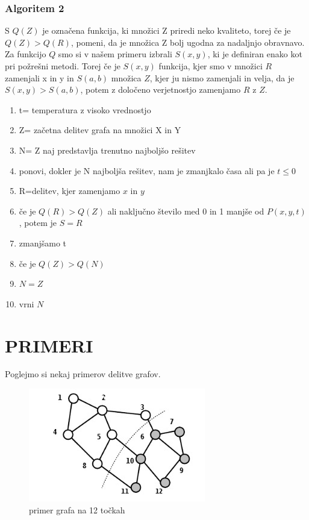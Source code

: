 \documentclass[12pt,a4paper]{amsart}
\theoremstyle{definition} %
\theoremstyle{plain} %
\begin{document}
\subsubsection{Algoritem 2}
S $Q(Z)$ je označena funkcija, ki množici Z priredi neko kvaliteto, torej če je $Q(Z) >Q(R)$, pomeni, da je množica Z bolj ugodna za nadaljnjo obravnavo.
Za funkcijo $Q$ smo si v našem primeru izbrali $S(x,y)$, ki je definiran enako kot pri požrešni metodi. Torej če je $S(x,y)$ funkcija, kjer smo v množici $R$ zamenjali x in y in $S(a,b)$ množica $Z$, kjer ju nismo zamenjali in velja, da je $S(x,y) > S(a,b)$, potem z določeno verjetnostjo zamenjamo $R$ z $Z$. 
\begin{enumerate}
\item t= temperatura z visoko vrednostjo
\item Z= začetna delitev grafa na množici X in Y 
\item N= Z  naj predstavlja trenutno najboljšo rešitev
\item ponovi, dokler je N najboljša rešitev, nam je zmanjkalo časa ali pa je $t \leq 0$
\item 			R=delitev, kjer zamenjamo $x$ in $y$
\item 			če je $Q(R)>Q(Z)$ ali naključno število med 0 in 1 manjše od $P(x,y,t)$, potem je $S=R$
\item 			zmanjšamo t
\item 			če je $Q(Z)>Q(N)$ 
\item 				$N=Z$
\item vrni $N$		
\end{enumerate}


\section{\textbf{PRIMERI}}
Poglejmo si nekaj primerov delitve grafov. 
\pagebreak
\begin{figure}[h]
    \centering
    \includegraphics{prvi_graf} 
    \caption{primer grafa na 12 točkah}
    \label{fig:1_graf}
\end{figure}
\end{document}

